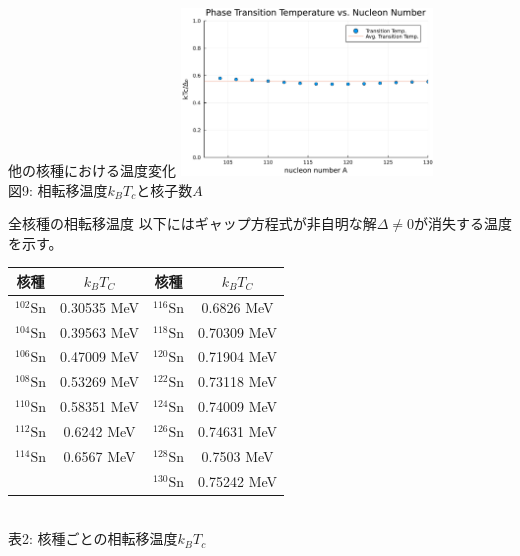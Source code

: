\documentclass[aspectratio=169, 12pt, dvipdfmx]{beamer}
\begin{document}
\begin{frame}{他の核種における温度変化}
  \centering
  \includegraphics[width=0.5\textwidth]{A_kT.pdf}
  \vspace{5pt} %
  \\
  \scriptsize 図9: 相転移温度$k_BT_c$と核子数$A$\\
\end{frame}

\begin{frame}{全核種の相転移温度}
  以下にはギャップ方程式が非自明な解\(\Delta \neq 0\)が消失する温度を示す。
  \centering
  \begin{tabular}{c|c || c|c}
    核種 & \(k_B T_C\) & 核種 & \(k_B T_C\) \\
    \hline
    $\mathrm{{}^{102}Sn}$ & 0.30535 MeV & $\mathrm{{}^{116}Sn}$ & 0.6826 MeV \\
    $\mathrm{{}^{104}Sn}$ & 0.39563 MeV & $\mathrm{{}^{118}Sn}$ & 0.70309 MeV \\
    $\mathrm{{}^{106}Sn}$ & 0.47009 MeV & $\mathrm{{}^{120}Sn}$ & 0.71904 MeV \\
    $\mathrm{{}^{108}Sn}$ & 0.53269 MeV & $\mathrm{{}^{122}Sn}$ & 0.73118 MeV \\
    $\mathrm{{}^{110}Sn}$ & 0.58351 MeV & $\mathrm{{}^{124}Sn}$ & 0.74009 MeV \\
    $\mathrm{{}^{112}Sn}$ & 0.6242 MeV & $\mathrm{{}^{126}Sn}$ & 0.74631 MeV \\
    $\mathrm{{}^{114}Sn}$ & 0.6567 MeV & $\mathrm{{}^{128}Sn}$ & 0.7503 MeV \\
    & & $\mathrm{{}^{130}Sn}$ & 0.75242 MeV
  \end{tabular}
  \vspace{5pt}\\
  \scriptsize 表2: 核種ごとの相転移温度$k_B T_c$\\
\end{frame}
\end{document}
